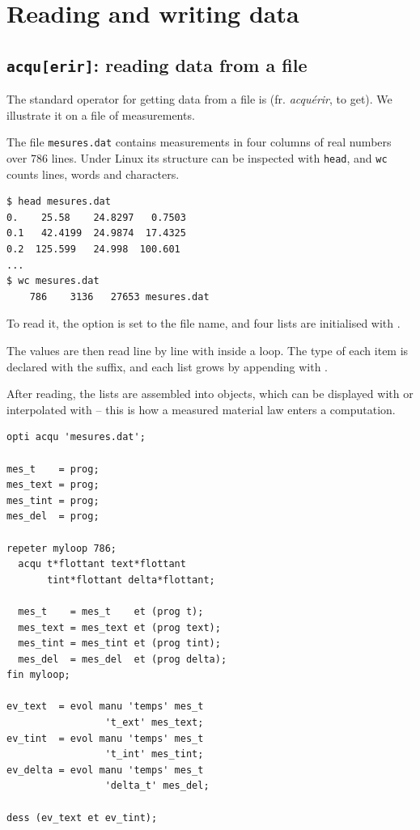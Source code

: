 \section{Reading and writing data}

\subsection{\texttt{acqu[erir]}: reading data from a file}

The standard operator for getting data from a file is 
 (fr. \emph{acquérir}, to get). We
illustrate it on a file of measurements.

\begin{castemcom}
The file \texttt{mesures.dat} contains measurements in four columns of real
numbers over 786 lines. Under Linux its structure can be inspected with
\texttt{head}, and \texttt{wc} counts lines, words and characters.
\end{castemcom}
\begin{castemlines}
\begin{verbatim}
$ head mesures.dat
0.    25.58    24.8297   0.7503
0.1   42.4199  24.9874  17.4325
0.2  125.599   24.998  100.601
...
$ wc mesures.dat
    786    3136   27653 mesures.dat
\end{verbatim}
\end{castemlines}

\begin{castemcom}
To read it, the  option is set to the file name, and four
lists are initialised with .

The values are then read line by line with  inside a
 loop. The type of each item is declared with the
 suffix, and each list grows by appending with .

After reading, the lists are assembled into  objects, which can
be displayed with  or interpolated with  -- this is
how a measured material law enters a computation.
\end{castemcom}
\begin{castemlines}
\begin{verbatim}
opti acqu 'mesures.dat';

mes_t    = prog;
mes_text = prog;
mes_tint = prog;
mes_del  = prog;

repeter myloop 786;
  acqu t*flottant text*flottant
       tint*flottant delta*flottant;

  mes_t    = mes_t    et (prog t);
  mes_text = mes_text et (prog text);
  mes_tint = mes_tint et (prog tint);
  mes_del  = mes_del  et (prog delta);
fin myloop;

ev_text  = evol manu 'temps' mes_t
                 't_ext' mes_text;
ev_tint  = evol manu 'temps' mes_t
                 't_int' mes_tint;
ev_delta = evol manu 'temps' mes_t
                 'delta_t' mes_del;

dess (ev_text et ev_tint);
\end{verbatim}
\end{castemlines}

